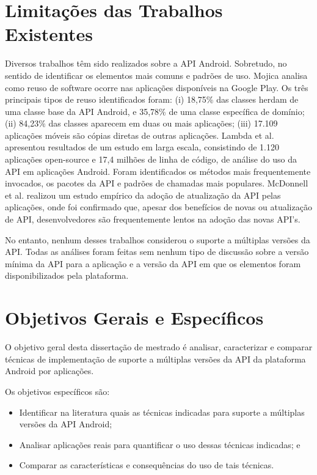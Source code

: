 \section{Limitações das Trabalhos Existentes} \label{sec:limitacao-abordagens-atuais}
Diversos trabalhos têm sido realizados sobre a API Android. Sobretudo, no sentido
de identificar os elementos mais comuns e padrões de uso. Mojica \cite{Mojica2014}
analisa como reuso de software ocorre nas aplicações disponíveis na Google Play.
Os três principais tipos de reuso identificados foram: (i) 18,75\% das classes
herdam de uma classe base da API Android, e 35,78\% de uma classe específica de
domínio; (ii) 84,23\% das classes aparecem em duas ou mais aplicações; (iii)
17.109 aplicações móveis são cópias diretas de outras aplicações. Lambda et al. \cite{Lamba2015}
apresentou resultados de um estudo em larga escala, consistindo de 1.120 aplicações
open-source e 17,4 milhões de linha de código, de análise do uso da API em aplicações
Android. Foram identificados os métodos mais frequentemente invocados, os pacotes da
API e padrões de chamadas mais populares. McDonnell et al. \cite{McDonnell2013}
realizou um estudo empírico da adoção de atualização da API pelas aplicações,
onde foi confirmado que, apesar dos benefícios de novas ou atualização de API,
desenvolvedores são frequentemente lentos na adoção das novas API’s.
 
No entanto, nenhum desses trabalhos considerou o suporte a múltiplas versões da API.
Todas as análises foram feitas sem nenhum tipo de discussão sobre a versão mínima da
API para a aplicação e a versão da API em que os elementos foram disponibilizados
pela plataforma.

\section{Objetivos Gerais e Específicos} \label{sec:objetivos-gerais-especificos}

O objetivo geral desta dissertação de mestrado é analisar, caracterizar e comparar
técnicas de implementação de suporte a múltiplas versões da API da plataforma
Android por aplicações.

Os objetivos específicos são:
\begin{itemize}
	\item Identificar na literatura quais as técnicas indicadas para suporte a
	múltiplas versões da API Android;
	\item Analisar aplicações reais para quantificar o uso dessas técnicas
	indicadas; e
	\item Comparar as características e consequências do uso de tais técnicas.
\end{itemize}


